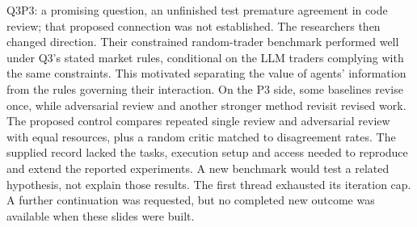 \documentclass[aspectratio=1610,11pt]{beamer}
\begin{document}
\begin{frame}[t]{Q3P3: a promising question, an unfinished test}
{premature agreement in code review; that proposed connection was not established.
The researchers then changed direction. Their constrained random-trader benchmark performed well
under Q3's stated market rules, conditional on the LLM traders complying with the same constraints.
This motivated separating the value of agents' information from the rules governing their interaction.
On the P3 side, some baselines
revise once, while adversarial review and another stronger method revisit revised work. The proposed
control compares repeated single review and adversarial review with equal resources, plus a random
critic matched to disagreement rates. The supplied record lacked the tasks, execution setup and
access needed to reproduce and extend the reported experiments. A new benchmark would test a related
hypothesis, not explain those results. The first thread exhausted its iteration cap. A further
continuation was requested, but no completed new outcome was available when these slides were built.}
\end{frame}
\end{document}
